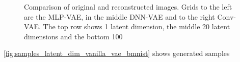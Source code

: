 \begin{figure}[!htb]
\qquad
{}
\caption{Comparison of original and reconstructed images. Grids to the left are the MLP-VAE, in the middle DNN-VAE and to the right Conv-VAE. The top row shows 1 latent dimension, the middle 20 latent dimensions and the bottom 100}
\label{fig:recon_latent_dim_vanilla_vae_bmnist}
\end{figure}


\autoref{fig:samples_latent_dim_vanilla_vae_bmnist} shows generated samples

